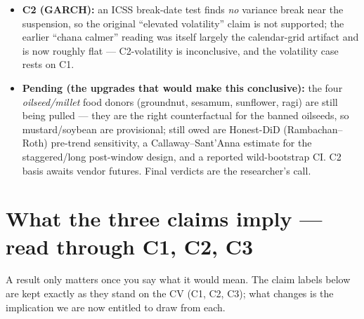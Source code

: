 \documentclass[11pt]{article}
\begin{document}
\begin{itemize}[leftmargin=1.6em]
        its placebo and pre-trend tests and the naive DiD looked dead. I traced that to
        a calendar-grid measurement bug: the mandi series carried weekend/holiday
        prices forward while realized volatility was annualised on 252 trading days,
        manufacturing spurious autocorrelation. After the fix (clean-core stage) the
        pass was only \emph{marginal} --- the Dec-2019 placebo recovered $-11.7\%$,
        $\approx$56\% of the then-headline, and a hot final pre-bin ($+10\%$,
        $p=0.049$) lurked under the joint test. On the \emph{current food-donor panel}
        the battery is genuinely clean: placebo $-6.5\%$ ($p\approx0.34$ analytic /
        $0.43$ bootstrap) and joint pre-trend $p\approx0.45$ with \emph{no}
        individually significant lead bin. \emph{The research-integrity headline is
        the bug I caught and fixed --- and that the estimate answers to the quality of
        its counterfactual.}
  \item \textbf{C2 (GARCH):} an ICSS break-date test finds \emph{no} variance break
        near the suspension, so the original ``elevated volatility'' claim is not
        supported; the earlier ``chana calmer'' reading was itself largely the
        calendar-grid artifact and is now roughly flat --- C2-volatility is
        inconclusive, and the volatility case rests on C1.
  \item \textbf{Pending (the upgrades that would make this conclusive):} the four
        \emph{oilseed/millet} food donors (groundnut, sesamum, sunflower, ragi) are
        still being pulled --- they are the right counterfactual for the banned
        oilseeds, so mustard/soybean are provisional; still owed are Honest-DiD
        (Rambachan--Roth) pre-trend sensitivity, a Callaway--Sant'Anna estimate for the
        staggered/long post-window design, and a reported wild-bootstrap CI. C2 basis
        awaits vendor futures. Final verdicts are the researcher's call.
\end{itemize}

\section{What the three claims imply --- read through C1, C2, C3}
A result only matters once you say what it would mean. The claim labels below are kept
exactly as they stand on the CV (C1, C2, C3); what changes is the implication we are now
entitled to draw from each.
\end{document}
